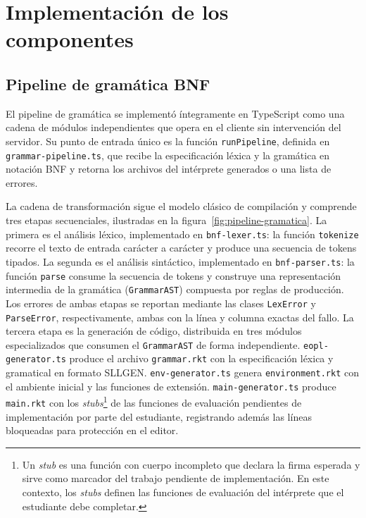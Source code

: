 \section{Implementación de los componentes}

\subsection{Pipeline de gramática BNF}

El pipeline de gramática se implementó íntegramente en TypeScript \cite{typescript} como una cadena de módulos independientes que opera en el cliente sin intervención del servidor. Su punto de entrada único es la función \texttt{run\allowbreak Pipeline}, definida en \texttt{grammar-pipeline.ts}, que recibe la especificación léxica y la gramática en notación BNF y retorna los archivos del intérprete generados o una lista de errores.

La cadena de transformación sigue el modelo clásico de compilación \cite{aho2006compilers} y comprende tres etapas secuenciales, ilustradas en la figura~\ref{fig:pipeline-gramatica}. La primera es el análisis léxico, implementado en \texttt{bnf-lexer.ts}: la función \texttt{tokenize} recorre el texto de entrada carácter a carácter y produce una secuencia de tokens tipados. La segunda es el análisis sintáctico, implementado en \texttt{bnf-parser.ts}: la función \texttt{parse} consume la secuencia de tokens y construye una representación intermedia de la gramática (\texttt{GrammarAST}) compuesta por reglas de producción. Los errores de ambas etapas se reportan mediante las clases \texttt{LexError} y \texttt{ParseError}, respectivamente, ambas con la línea y columna exactas del fallo. La tercera etapa es la generación de código, distribuida en tres módulos especializados que consumen el \texttt{GrammarAST} de forma independiente. \texttt{eopl-generator.ts} produce el archivo \texttt{grammar.rkt} con la especificación léxica y gramatical en formato SLLGEN. \texttt{env-generator.ts} genera \texttt{environment.rkt} con el ambiente inicial y las funciones de extensión. \texttt{main-generator.ts} produce \texttt{main.rkt} con los \textit{stubs}\footnote{Un \textit{stub} es una función con cuerpo incompleto que declara la firma esperada y sirve como marcador del trabajo pendiente de implementación. En este contexto, los \textit{stubs} definen las funciones de evaluación del intérprete que el estudiante debe completar.} de las funciones de evaluación pendientes de implementación por parte del estudiante, registrando además las líneas bloqueadas para protección en el editor.

